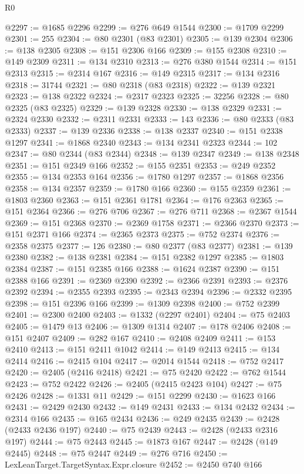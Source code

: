\begin{lexlean}{R0}
\begin{coremodule}
@2297 := @1685 @2296
@2299 := @276 @649 @1544
@2300 := @1709 @2299
@2301 := 255
@2304 := @80 @2301 (@83 @2301)
@2305 := @139 @2304
@2306 := @138 @2305
@2308 := @151 @2306 @166
@2309 := @155 @2308
@2310 := @149 @2309
@2311 := @134 @2310
@2313 := @276 @380 @1544
@2314 := @151 @2313
@2315 := @2314 @167
@2316 := @149 @2315
@2317 := @134 @2316
@2318 := 31744
@2321 := @80 @2318 (@83 @2318)
@2322 := @139 @2321
@2323 := @138 @2322
@2324 := @2317 @2323
@2325 := 32256
@2328 := @80 @2325 (@83 @2325)
@2329 := @139 @2328
@2330 := @138 @2329
@2331 := @2324 @2330
@2332 := @2311 @2331
@2333 := 143
@2336 := @80 @2333 (@83 @2333)
@2337 := @139 @2336
@2338 := @138 @2337
@2340 := @151 @2338 @1297
@2341 := @1868 @2340
@2343 := @134 @2341 @2323
@2344 := 102
@2347 := @80 @2344 (@83 @2344)
@2348 := @139 @2347
@2349 := @138 @2348
@2351 := @151 @2349 @166
@2352 := @155 @2351
@2353 := @249 @2352
@2355 := @134 @2353 @164
@2356 := @1780 @1297
@2357 := @1868 @2356
@2358 := @134 @2357
@2359 := @1780 @166
@2360 := @155 @2359
@2361 := @1803 @2360
@2363 := @151 @2361 @1781
@2364 := @176 @2363
@2365 := @151 @2364
@2366 := @276 @706
@2367 := @276 @711
@2368 := @2367 @1544
@2369 := @151 @2368
@2370 := @2369 @1758
@2371 := @2366 @2370
@2373 := @151 @2371 @166
@2374 := @2365 @2373
@2375 := @752 @2374
@2376 := @2358 @2375
@2377 := 126
@2380 := @80 @2377 (@83 @2377)
@2381 := @139 @2380
@2382 := @138 @2381
@2384 := @151 @2382 @1297
@2385 := @1803 @2384
@2387 := @151 @2385 @166
@2388 := @1624 @2387
@2390 := @151 @2388 @166
@2391 := @2369 @2390
@2392 := @2366 @2391
@2393 := @2376 @2392
@2394 := @2355 @2393
@2395 := @2343 @2394
@2396 := @2332 @2395
@2398 := @151 @2396 @166
@2399 := @1309 @2398
@2400 := @752 @2399
@2401 := @2300 @2400
@2403 := @1332 (@2297 @2401)
@2404 := @75 @2403
@2405 := @1479 @13
@2406 := @1309 @1314
@2407 := @178 @2406
@2408 := @151 @2407
@2409 := @282 @167
@2410 := @2408 @2409
@2411 := @153 @2410
@2413 := @151 @2411 @1042
@2414 := @149 @2413
@2415 := @134 @2414
@2416 := @2415 @104
@2417 := @2014 @1544
@2418 := @752 @2417
@2420 := @2405 (@2416 @2418)
@2421 := @75 @2420
@2422 := @762 @1544
@2423 := @752 @2422
@2426 := @2405 (@2415 @2423 @104)
@2427 := @75 @2426
@2428 := @1331 @11
@2429 := @151 @2299
@2430 := @1623 @166
@2431 := @2429 @2430
@2432 := @149 @2431
@2433 := @134 @2432
@2434 := @2314 @166
@2435 := @165 @2434
@2436 := @249 @2435
@2439 := @2428 (@2433 @2436 @197)
@2440 := @75 @2439
@2443 := @2428 (@2433 @2316 @197)
@2444 := @75 @2443
@2445 := @1873 @167
@2447 := @2428 (@149 @2445)
@2448 := @75 @2447
@2449 := @276 @716
@2450 := LexLeanTarget.TargetSyntax.Expr.closure
@2452 := @2450 @740 @166

\end{coremodule}
\end{lexlean}
